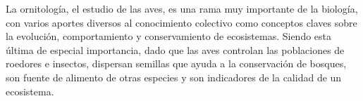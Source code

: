 La ornitología, el estudio de las aves, es una rama muy importante de la biología, con varios aportes diversos al conocimiento colectivo como conceptos claves sobre la evolución, comportamiento y conservamiento de ecosistemas. Siendo esta última de especial importancia, dado que las aves controlan las poblaciones de roedores e insectos, dispersan semillas que ayuda a la conservación de bosques, son fuente de alimento de otras especies y son indicadores de la calidad de un ecosistema.


